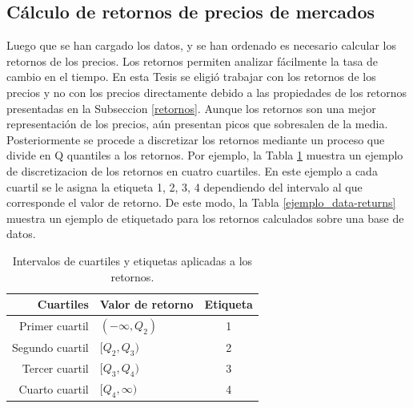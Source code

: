 \subsection{Cálculo de retornos de precios de mercados}
\label{sec_retornos}
Luego que se han cargado los datos, y se han ordenado es necesario calcular los retornos de los precios. 
Los retornos permiten analizar fácilmente la tasa de cambio en el tiempo.
En esta Tesis se eligió trabajar con los retornos de los precios y no con los precios directamente debido a las propiedades de los retornos presentadas en la Subseccion \ref{retornos}.
Aunque los retornos son una mejor representación de los precios, aún presentan picos que sobresalen de la media. 
Posteriormente se procede a discretizar los retornos mediante un proceso que divide en Q quantiles a los retornos.
Por ejemplo, la Tabla \ref{quantile_example} muestra un ejemplo de discretizacion de los retornos en cuatro cuartiles. 
En este ejemplo a cada cuartil se le asigna la etiqueta 1, 2, 3, 4 dependiendo del intervalo al que corresponde el valor de retorno.
De este modo, la Tabla \ref{ejemplo_data-returns} muestra un ejemplo de etiquetado para los retornos calculados sobre una base de datos.

\begin{table}	
\begin{center}
	\begin{tabular}{ |r | l | c| }
		\hline
		Cuartiles &  Valor de retorno & Etiqueta  \\ \hline
		Primer cuartil & $(-\infty , Q_2)$ & 1 \\
		Segundo cuartil & $[Q_2 , Q_3)$   & 2\\ 
		Tercer cuartil &  $[Q_3 , Q_4)$   & 3 \\
		Cuarto cuartil & $[Q_4 , \infty)$ &4\\ 
		\hline
	\end{tabular}
	\label{quantile_example}
		\caption{Intervalos de cuartiles y etiquetas aplicadas a los retornos.}
\end{center}
\end{table}



